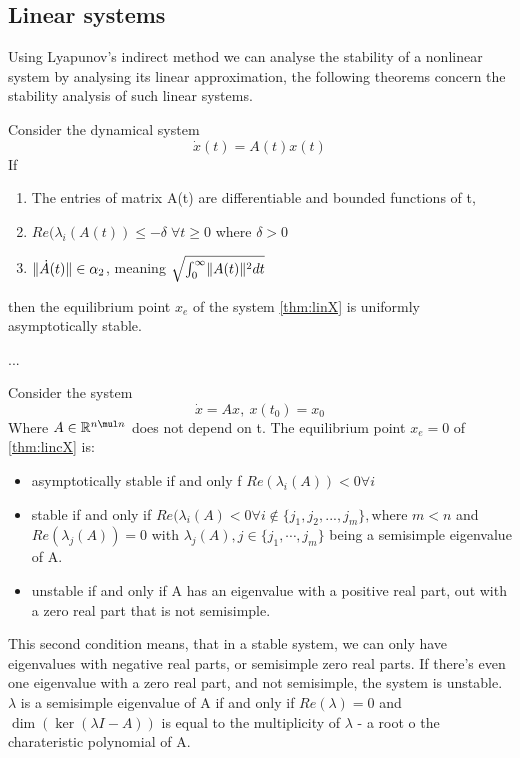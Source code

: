 \subsection{Linear systems}
Using Lyapunov's indirect method we can analyse the stability of a nonlinear system by analysing its linear approximation, the following theorems concern the stability analysis of such linear systems.
\thm{}
{
    Consider the dynamical system
             \begin{equation}
                \label{thm:linX}
                \dot{x}(t) = A(t)x(t)
            \end{equation}
     If 
     \begin{enumerate}
         \item The entries of matrix A(t) are differentiable and bounded functions of t,
        \item $Re(\lambda_i(A(t)) \le -\delta \; \forall t\ge 0$ where $\delta > 0$
        \item $\lVert\dot{A}(t)\rVert \in \alpha_2$, meaning $\sqrt{\int_0^\infty \lVert A(t)\rVert^2 dt}$
     \end{enumerate}
    then the equilibrium point $x_e$ of the system  \ref{thm:linX} is uniformly asymptotically stable.

    \ex{}
    {...}
}
\thm{}
{
 Consider the system
 \begin{equation}
     \label{thm:lincX}
     \dot{x} = Ax, \: x(t_0) = x_0
 \end{equation}
 Where $A \in \mathbb{R}^{n\mul n}$ does not depend on t. The equilibrium point $x_e = 0$ of \ref{thm:lincX} is:
 \begin{itemize}
         \item asymptotically stable if and only f $Re(\lambda_i(A)) < 0 \forall i $ 
         \item stable if and only if $Re(\lambda_i(A) < 0 \forall i \not \in \{j_1, j_2, ..., j_m\}, \text{where } m < n $ and $Re(\lambda_j(A)) = 0$ with  $\lambda_j(A), j \in \{ j_1, \cdots ,j_m\}$ being a semisimple eigenvalue of A. 
         \item unstable if and only if A has an eigenvalue with a positive real part, out with a zero real part that is not semisimple.
         
 \end{itemize}
 \nt
 {
     This second condition means, that in a stable system, we can only have eigenvalues with negative real parts, or semisimple zero real parts. If there's even one eigenvalue with a zero real part, and not semisimple, the system is unstable.
 }
 {
     $\lambda$ is a semisimple eigenvalue of A if and only if  $Re(\lambda) = 0$ and  $\dim (\ker (\lambda I - A))$ is equal to the multiplicity of  $\lambda$ - a root o the charateristic polynomial of A.
 }

 \ex{}
 {}
}


